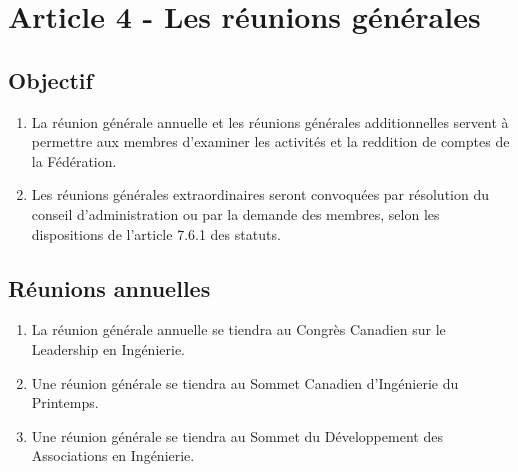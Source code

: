 \section{Article 4 - Les réunions générales}
\label{article-4-les-reunions-generales}

\subsection{Objectif}
\label{objectif}

\begin{enumerate}
 \item
  La réunion générale annuelle et les réunions générales additionnelles servent à permettre aux membres d'examiner les activités et la reddition de comptes de la Fédération.
 \item
  Les réunions générales extraordinaires seront convoquées par résolution du conseil d’administration ou par la demande des membres, selon les dispositions de l'article 7.6.1 des statuts.
\end{enumerate}

\subsection{Réunions annuelles}
\label{reunions-annuelles}

\begin{enumerate}
 \item
  La réunion générale annuelle se tiendra au Congrès Canadien sur le Leadership en Ingénierie.
 \item
  Une réunion générale se tiendra au Sommet Canadien d'Ingénierie du Printemps.
 \item
  Une réunion générale se tiendra au Sommet du Développement des Associations en Ingénierie.
\end{enumerate}
